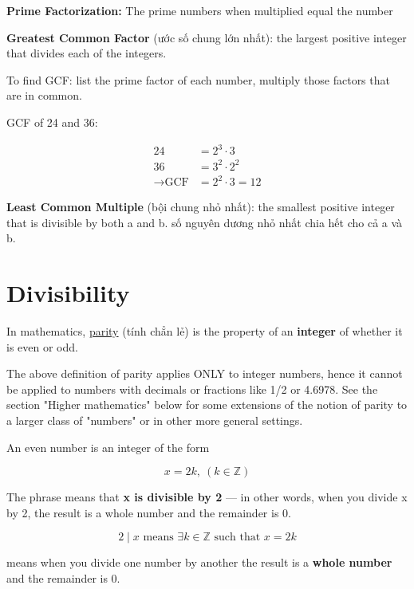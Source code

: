 \textbf{Prime Factorization:} The prime numbers when multiplied equal the number

\vspace{10 mm}

\textbf{Greatest Common Factor} (ước số chung lớn nhất): the largest positive integer that divides each of the integers.

To find GCF: list the prime factor of each number, multiply those factors that are in common.

GCF of 24 and 36:

\[
  \begin{aligned}
    24 &= 2^{3} \cdot 3\\
    36 &= 3^{2} \cdot 2^{2}\\
    \rightarrow \text{GCF} &= 2^{2} \cdot 3 = 12
  \end{aligned}\]
\[\]

\textbf{Least Common Multiple} (bội chung nhỏ nhất): the smallest positive integer that is divisible by both a and b. số nguyên dương nhỏ nhất chia hết cho cả a và b.

\section{Divisibility}

In mathematics, \href{https://en.wikipedia.org/wiki/Parity_%28mathematics%29}{parity} (tính chẳn lẻ) is the property of an \textbf{integer} of whether it is even or odd.

The above definition of parity applies ONLY to integer numbers, hence it cannot be applied to numbers with decimals or fractions like 1/2 or 4.6978. See the section "Higher mathematics" below for some extensions of the notion of parity to a larger class of "numbers" or in other more general settings. 

An even number is an integer of the form

\[x=2k,\ (k \in \mathbb{Z})\]

\vspace{10 mm}

The phrase  means that \textbf{x is divisible by 2} — in other words, when you divide x by 2, the result is a whole number and the remainder is 0.

\[2 \mid x \text{ means } \exists k \in \mathbb{Z} \text{ such that } x = 2k\]

 means when you divide one number by another the result is a \textbf{whole number} and the remainder is 0.

